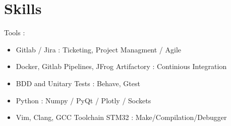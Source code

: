 \documentclass[a4paper]{friggeri-cv} %
\begin{document}

\section{Skills}

Tools :
\begin{itemize}
\item Gitlab / Jira : Ticketing, Project Managment / Agile 
\item Docker, Gitlab Pipelines, JFrog Artifactory :  Continious Integration
\item BDD and Unitary Tests : Behave, Gtest
\item Python : Numpy / PyQt / Plotly / Sockets
\item Vim, Clang, GCC Toolchain STM32 : Make/Compilation/Debugger
\end{itemize}



\end{document}
